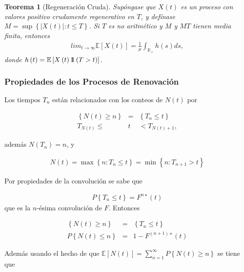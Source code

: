 \documentclass{article}
\newtheorem{Teo}{Teorema}
\newcommand{\rea}{\mathbb{R}}
\newcommand{\esp}{\mathbb{E}}
\newcommand{\indora}{\mbox{$1$\hspace{-0.8ex}$1$}}
\begin{document}
\begin{Teo}[Regeneraci\'on Cruda]
Sup\'ongase que $X\left(t\right)$ es un proceso con valores positivo crudamente regenerativo en $T$, y def\'inase $M=\sup\left\{|X\left(t\right)|:t\leq T\right\}$. Si $T$ es no aritm\'etico y $M$ y $MT$ tienen media finita, entonces
\begin{eqnarray*}
lim_{t\rightarrow\infty}\esp\left[X\left(t\right)\right]=\frac{1}{\mu}\int_{\rea_{+}}h\left(s\right)ds,
\end{eqnarray*}
donde $h\left(t\right)=\esp\left[X\left(t\right)\indora\left(T>t\right)\right]$.
\end{Teo}

%
\subsubsection{Propiedades de los Procesos de Renovaci\'on}
%

Los tiempos $T_{n}$ est\'an relacionados con los conteos de $N\left(t\right)$ por

\begin{eqnarray*}
\left\{N\left(t\right)\geq n\right\}&=&\left\{T_{n}\leq t\right\}\\
T_{N\left(t\right)}\leq &t&<T_{N\left(t\right)+1},
\end{eqnarray*}

adem\'as $N\left(T_{n}\right)=n$, y 

\begin{eqnarray*}
N\left(t\right)=\max\left\{n:T_{n}\leq t\right\}=\min\left\{n:T_{n+1}>t\right\}
\end{eqnarray*}

Por propiedades de la convoluci\'on se sabe que

\begin{eqnarray*}
P\left\{T_{n}\leq t\right\}=F^{n\star}\left(t\right)
\end{eqnarray*}
que es la $n$-\'esima convoluci\'on de $F$. Entonces 

\begin{eqnarray*}
\left\{N\left(t\right)\geq n\right\}&=&\left\{T_{n}\leq t\right\}\\
P\left\{N\left(t\right)\leq n\right\}&=&1-F^{\left(n+1\right)\star}\left(t\right)
\end{eqnarray*}

Adem\'as usando el hecho de que $\esp\left[N\left(t\right)\right]=\sum_{n=1}^{\infty}P\left\{N\left(t\right)\geq n\right\}$
se tiene que
\end{document}

